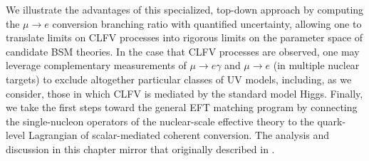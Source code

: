 \documentclass{book}[letterpaper,12pt]
\begin{document}
We illustrate the advantages of this specialized, top-down approach by computing the $\mu\rightarrow e$ conversion branching ratio with quantified uncertainty, allowing one to translate limits on CLFV processes into rigorous limits on the parameter space of candidate BSM theories. In the case that CLFV processes are observed, one may leverage complementary measurements of $\mu\rightarrow e\gamma$ and $\mu\rightarrow e$ (in multiple nuclear targets) to exclude altogether particular classes of UV models, including, as we consider, those in which CLFV is mediated by the standard model Higgs. Finally, we take the first steps toward the general EFT matching program by connecting the single-nucleon operators of the nuclear-scale effective theory to the quark-level Lagrangian of scalar-mediated coherent conversion. The analysis and discussion in this chapter mirror that originally described in \cite{Cirigliano:2022ekw}.
\end{document}
